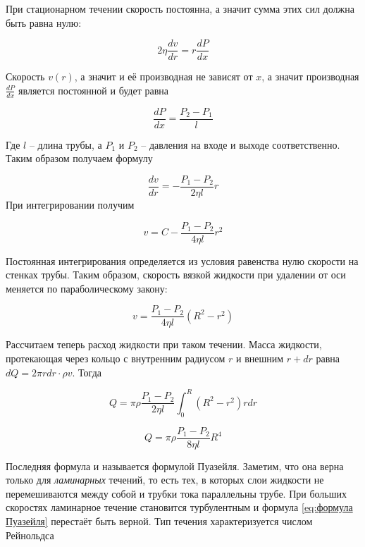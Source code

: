 \noindent
При стационарном течении скорость постоянна, а значит сумма этих сил должна быть равна нулю:

\begin{equation*}
    2 \eta \frac{dv}{dr} = r \frac{dP}{dx}
\end{equation*}

\noindent
Скорость $v(r)$, а значит и её производная не зависят от $x$, а значит производная $\frac{dP}{dx}$ является постоянной и будет равна

\begin{equation*}
    \frac{dP}{dx} = \frac{P_2 - P_1}{l}
\end{equation*}

\noindent
Где $l$ -- длина трубы, а $P_1$ и $P_2$ -- давления на входе и выходе соответственно. Таким образом получаем формулу

\begin{equation}
    \frac{dv}{dr} = -  \frac{P_1 - P_2}{2 \eta l} r
\end{equation}
\noindent
При интегрировании получим

\begin{equation*}
    v = C - \frac{P_1 - P_2}{4 \eta l} r^2
\end{equation*}

\noindent
Постоянная интегрирования определяется из условия равенства нулю скорости на стенках трубы. Таким образом, скорость вязкой жидкости при удалении от оси меняется по параболическому закону:

\begin{equation}
    v = \frac{P_1 - P_2}{4 \eta l} \left( R^2 - r^2 \right)
\end{equation}

Рассчитаем теперь расход жидкости при таком течении. Масса жидкости, протекающая через кольцо с внутренним радиусом $r$ и внешним $r + dr$ равна $dQ = 2 \pi r dr \cdot \rho v$. Тогда

\begin{equation*}
    Q = \pi \rho \frac{P_1 - P_2}{2 \eta l} \int_0^R \left( R^2 - r^2 \right) r dr
\end{equation*}

\begin{equation} \label{eq:формула Пуазейля}
    Q = \pi \rho \frac{P_1 - P_2}{8 \eta l} R^4
\end{equation}

\noindent
Последняя формула и называется формулой Пуазейля. Заметим, что она верна только для \textit{ламинарных} течений, то есть тех, в которых слои жидкости не перемешиваются между собой и трубки тока параллельны трубе. При больших скоростях ламинарное течение становится турбулентным и формула \eqref{eq:формула Пуазейля} перестаёт быть верной. Тип течения характеризуется числом Рейнольдса

